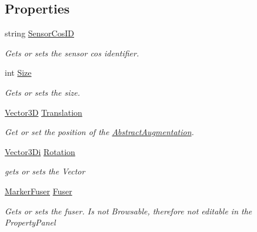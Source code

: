 \subsection*{Properties}
\begin{DoxyCompactItemize}
\item 
string \hyperlink{class_a_rdev_kit_1_1_model_1_1_project_1_1_abstract2_d_trackable_a9578380939f19267cc7372ca19ff936f}{Sensor\-Cos\-I\-D}
\begin{DoxyCompactList}\small\item\em Gets or sets the sensor cos identifier. \end{DoxyCompactList}\item 
int \hyperlink{class_a_rdev_kit_1_1_model_1_1_project_1_1_abstract2_d_trackable_a0c9a459cf25e74c8173564d476021c9a}{Size}
\begin{DoxyCompactList}\small\item\em Gets or sets the size. \end{DoxyCompactList}\item 
\hyperlink{class_a_rdev_kit_1_1_model_1_1_project_1_1_vector3_d}{Vector3\-D} \hyperlink{class_a_rdev_kit_1_1_model_1_1_project_1_1_abstract2_d_trackable_acbb38387d30cb1239814606b54099bb3}{Translation}
\begin{DoxyCompactList}\small\item\em Get or set the position of the \hyperlink{class_a_rdev_kit_1_1_model_1_1_project_1_1_abstract_augmentation}{Abstract\-Augmentation}. \end{DoxyCompactList}\item 
\hyperlink{class_a_rdev_kit_1_1_model_1_1_project_1_1_vector3_di}{Vector3\-Di} \hyperlink{class_a_rdev_kit_1_1_model_1_1_project_1_1_abstract2_d_trackable_a12ba493972e7d277e8f67294beb70355}{Rotation}
\begin{DoxyCompactList}\small\item\em gets or sets the Vector \end{DoxyCompactList}\item 
\hyperlink{class_a_rdev_kit_1_1_model_1_1_project_1_1_marker_fuser}{Marker\-Fuser} \hyperlink{class_a_rdev_kit_1_1_model_1_1_project_1_1_abstract2_d_trackable_a98e3270dac234f5acd6054707f4c1964}{Fuser}
\begin{DoxyCompactList}\small\item\em Gets or sets the fuser. Is not Browsable, therefore not editable in the Property\-Panel \end{DoxyCompactList}\end{DoxyCompactItemize}


